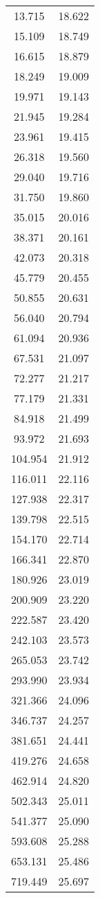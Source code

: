 \begin{table}
\begin{tabular}{cc}
13.715 & 18.622 \\
15.109 & 18.749 \\
16.615 & 18.879 \\
18.249 & 19.009 \\
19.971 & 19.143 \\
21.945 & 19.284 \\
23.961 & 19.415 \\
26.318 & 19.560 \\
29.040 & 19.716 \\
31.750 & 19.860 \\
35.015 & 20.016 \\
38.371 & 20.161 \\
42.073 & 20.318 \\
45.779 & 20.455 \\
50.855 & 20.631 \\
56.040 & 20.794 \\
61.094 & 20.936 \\
67.531 & 21.097 \\
72.277 & 21.217 \\
77.179 & 21.331 \\
84.918 & 21.499 \\
93.972 & 21.693 \\
104.954 & 21.912 \\
116.011 & 22.116 \\
127.938 & 22.317 \\
139.798 & 22.515 \\
154.170 & 22.714 \\
166.341 & 22.870 \\
180.926 & 23.019 \\
200.909 & 23.220 \\
222.587 & 23.420 \\
242.103 & 23.573 \\
265.053 & 23.742 \\
293.990 & 23.934 \\
321.366 & 24.096 \\
346.737 & 24.257 \\
381.651 & 24.441 \\
419.276 & 24.658 \\
462.914 & 24.820 \\
502.343 & 25.011 \\
541.377 & 25.090 \\
593.608 & 25.288 \\
653.131 & 25.486 \\
719.449 & 25.697 \\

\end{tabular}
\end{table}
